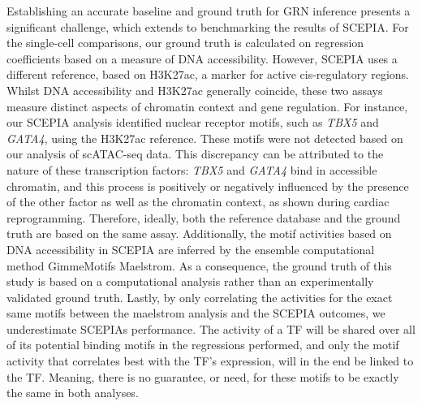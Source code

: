 Establishing an accurate baseline and ground truth for GRN inference presents a significant challenge, which extends to benchmarking the results of SCEPIA. For the single-cell comparisons, our ground truth is calculated on regression coefficients based on a measure of DNA accessibility. However, SCEPIA uses a different reference, based on H3K27ac, a marker for active cis-regulatory regions. Whilst DNA accessibility and H3K27ac generally coincide, these two assays measure distinct aspects of chromatin context and gene regulation. For instance, our SCEPIA analysis identified nuclear receptor motifs, such as \textit{TBX5} and \textit{GATA4}, using the H3K27ac reference. These motifs were not detected based on our analysis of scATAC-seq data. This discrepancy can be attributed to the nature of these transcription factors: \textit{TBX5} and \textit{GATA4} bind in accessible chromatin, and this process is positively or negatively influenced by the presence of the other factor as well as the chromatin context, as shown during cardiac reprogramming\cite{Stone2019}. Therefore, ideally, both the reference database and the ground truth are based on the same assay. Additionally, the motif activities based on DNA accessibility in SCEPIA are inferred by the ensemble computational method GimmeMotifs Maelstrom\cite{Bruse_2018}. As a consequence, the ground truth of this study is based on a computational analysis rather than an experimentally validated ground truth. Lastly, by only correlating the activities for the exact same motifs between the maelstrom analysis and the SCEPIA outcomes, we underestimate SCEPIAs performance. The activity of a TF will be shared over all of its potential binding motifs in the regressions performed, and only the motif activity that correlates best with the TF's expression, will in the end be linked to the TF. Meaning, there is no guarantee, or need, for these motifs to be exactly the same in both analyses.

